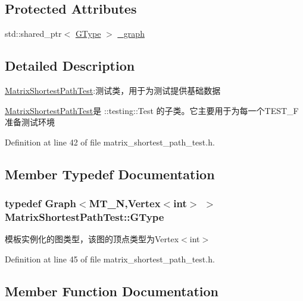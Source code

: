 \subsection*{Protected Attributes}
\begin{DoxyCompactItemize}
\item 
std\+::shared\+\_\+ptr$<$ \hyperlink{class_matrix_shortest_path_test_afa4c36c0b2a1b6974b44ba02e91f82ef}{G\+Type} $>$ \hyperlink{class_matrix_shortest_path_test_ab574b85fb02ec6e3c737277385073a2e}{\+\_\+graph}
\end{DoxyCompactItemize}


\subsection{Detailed Description}
\hyperlink{class_matrix_shortest_path_test}{Matrix\+Shortest\+Path\+Test}\+:测试类，用于为测试提供基础数据 

{\ttfamily \hyperlink{class_matrix_shortest_path_test}{Matrix\+Shortest\+Path\+Test}}是 {\ttfamily \+::testing\+::\+Test} 的子类。它主要用于为每一个{\ttfamily T\+E\+S\+T\+\_\+\+F}准备测试环境 

Definition at line 42 of file matrix\+\_\+shortest\+\_\+path\+\_\+test.\+h.



\subsection{Member Typedef Documentation}
\hypertarget{class_matrix_shortest_path_test_afa4c36c0b2a1b6974b44ba02e91f82ef}{}
\subsubsection[{G\+Type}]{\setlength{\rightskip}{0pt plus 5cm}typedef {\bf Graph}$<$M\+T\+\_\+\+N,{\bf Vertex}$<$int$>$ $>$ {\bf Matrix\+Shortest\+Path\+Test\+::\+G\+Type}}\label{class_matrix_shortest_path_test_afa4c36c0b2a1b6974b44ba02e91f82ef}
模板实例化的图类型，该图的顶点类型为{\ttfamily Vertex$<$int$>$} 

Definition at line 45 of file matrix\+\_\+shortest\+\_\+path\+\_\+test.\+h.



\subsection{Member Function Documentation}
\hypertarget{class_matrix_shortest_path_test_ac368aa3abba1f53406aca6232ad3b45f}{}
